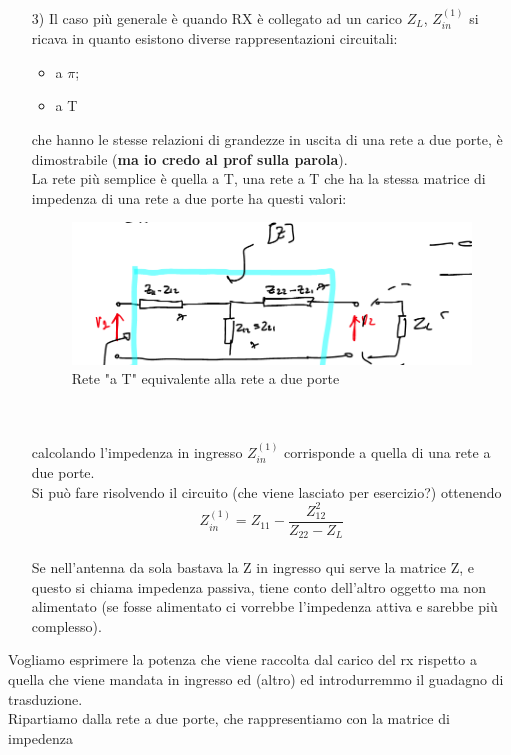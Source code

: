 \documentclass[oneside, 12pt]{extbook}
\begin{document}
\begin{itemize}
	\item[3)] Il caso più generale è quando RX è collegato ad un carico $Z_L$, $Z_{in}^{(1)}$ si ricava in quanto esistono diverse rappresentazioni circuitali:
	\begin{itemize}
		\item a $\pi$;
		\item a T
	\end{itemize}
	che hanno le stesse relazioni di grandezze in uscita di una rete a due porte, è dimostrabile (\textsf{\textbf{ma io credo al prof sulla parola}}).\\La rete più semplice è quella a T, una rete a T che ha la stessa matrice di impedenza di una rete a due porte ha questi valori:\\
	\begin{figure}
		\includegraphics[scale=0.5]{immagini/rete_t_equiv.png}
		\caption{Rete "a T" equivalente alla rete a due porte}
	\end{figure}
	\\\\calcolando l'impedenza in ingresso $Z_{in}^{(1)}$ corrisponde a quella di una rete a due porte.\\Si può fare risolvendo il circuito (che viene lasciato per esercizio?) ottenendo 
	\begin{equation}
	Z_{in}^{(1)} = Z_{11} - \dfrac{Z_{12}^2}{Z_{22} - Z_L}	
	\end{equation}
	\\Se nell'antenna da sola bastava la Z in ingresso qui serve la matrice Z, e questo si chiama impedenza passiva, tiene conto dell'altro oggetto ma non alimentato (se fosse alimentato ci vorrebbe l'impedenza attiva e sarebbe più complesso).
\end{itemize}
Vogliamo esprimere la potenza che viene raccolta dal carico del rx rispetto a quella che viene mandata in ingresso ed (altro) ed introdurremmo il guadagno di trasduzione.\\Ripartiamo dalla rete a due porte, che rappresentiamo con la matrice di impedenza\\
\end{document}
